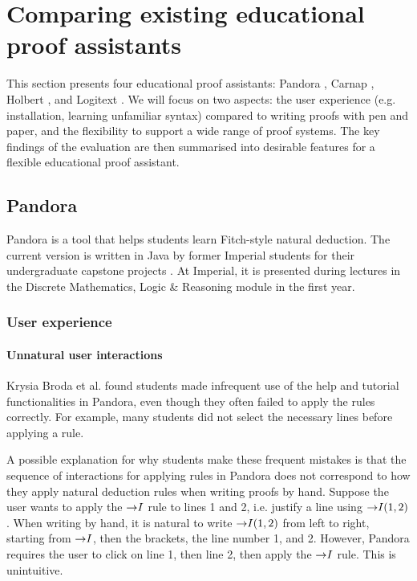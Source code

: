 
\section{Comparing existing educational proof assistants}
\label{background:comparison}
This section presents four educational proof assistants: Pandora \cite{pandora:2007, pandora}, Carnap \cite{carnap, carnap:2018}, Holbert \cite{oconnor:2022}, and Logitext \cite{yang:2022}. We will focus on two aspects: the user experience (e.g. installation, learning unfamiliar syntax) compared to writing proofs with pen and paper, and the flexibility to support a wide range of proof systems. The key findings of the evaluation are then summarised into desirable features for a flexible educational proof assistant.

\subsection{Pandora}
Pandora \cite{pandora:2007} is a tool that helps students learn Fitch-style \cite{fitch:1952} natural deduction. The current version \cite{pandora} is written in Java \cite{java} by former Imperial students for their undergraduate capstone projects \cite{pandora:2007}. At Imperial, it is presented during lectures in the Discrete Mathematics, Logic \& Reasoning module \cite{dmlr} in the first year.

\subsubsection{User experience}
\paragraph{Unnatural user interactions}
Krysia Broda et al. \cite{pandora:2007} found students made infrequent use of the help and tutorial functionalities in Pandora, even though they often failed to apply the rules correctly. For example, many students did not select the necessary lines before applying a rule.

A possible explanation for why students make these frequent mistakes is that the sequence of interactions for applying rules in Pandora does not correspond to how they apply natural deduction rules when writing proofs by hand. Suppose the user wants to apply the $\mathord{\to} I$ rule to lines 1 and 2, i.e. justify a line using $\mathord{\to} I(1, 2)$. When writing by hand, it is natural to write $\mathord{\to} I(1, 2)$ from left to right, starting from $\mathord{\to} I$, then the brackets, the line number 1, and 2. However, Pandora requires the user to click on line 1, then line 2, then apply the $\mathord{\to} I$ rule. This is unintuitive.

